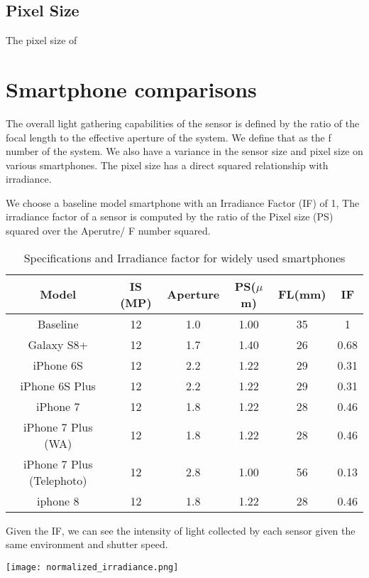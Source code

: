 \documentclass{article}
\begin{document}
\subsection{Pixel Size}

The pixel size of
\section{Smartphone comparisons}
The overall light gathering capabilities of the sensor is defined by the ratio of the focal length
to the effective aperture of the system. We define that as the f number of the system.
We also have a variance in the sensor size and pixel size on various smartphones. The
pixel size has a direct squared relationship with irradiance.

We choose a baseline model smartphone with an Irradiance Factor (IF) of 1,
The irradiance factor of a sensor is computed by the ratio of the Pixel size (PS) squared over
the Aperutre/ F number squared.

\begin{table}
\begin{tabular}{||c c c c c c||}
 \hline
 Model & IS (MP) & Aperture & PS($\mu$m) & FL(mm) & IF\\ [0.5ex]
 \hline\hline
 Baseline                  & 12 &1.0& 1.00 & 35 &1 \\
 Galaxy S8+                & 12 &1.7& 1.40 & 26 &0.68\\
 iPhone 6S                 & 12 &2.2& 1.22 & 29 &0.31\\
 iPhone 6S Plus            & 12 &2.2& 1.22 & 29 &0.31\\
 iPhone 7                  & 12 &1.8& 1.22 & 28 &0.46\\
 iPhone 7 Plus (WA)        & 12 &1.8& 1.22 & 28 &0.46\\
 iPhone 7 Plus (Telephoto) & 12 &2.8& 1.00 & 56 &0.13\\
 iphone 8                  & 12 &1.8& 1.22 & 28 &0.46\\[1ex]
 \hline
\end{tabular}
\caption{Specifications and Irradiance factor for widely used smartphones}
\label{table:1}
\end{table}

Given the IF, we can see the intensity of light collected by each sensor given the same
environment and shutter speed.

\begin{center}
  \texttt{[image: normalized\_irradiance.png]}
\end{center}
\end{document}
